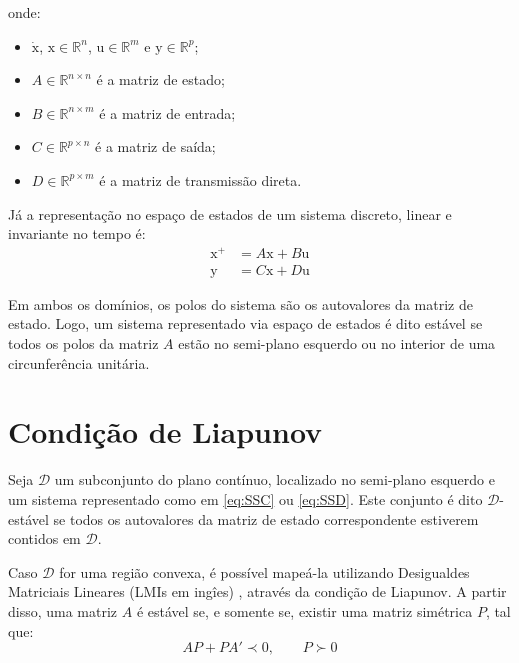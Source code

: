 \noindent onde:

\begin{itemize}
  \item $\dot{\pmb{\mathrm{x}}}$, $\pmb{\mathrm{x}} \in \mathbb{R}^n$, $\pmb{\mathrm{u}} \in \mathbb{R}^m$ e $\pmb{\mathrm{y}} \in \mathbb{R}^p$;
  \item $A \in \mathbb{R}^{n \times n}$ é a matriz de estado;
  \item $B \in \mathbb{R}^{n \times m}$ é a matriz de entrada;
  \item $C \in \mathbb{R}^{p \times n}$ é a matriz de saída;
  \item $D \in \mathbb{R}^{p \times m}$ é a matriz de transmissão direta.
\end{itemize}

Já a representação no espaço de estados de um sistema discreto, linear e invariante no tempo é:
\begin{subequations}
  \label{eq:SSD}
  \begin{align}
    \pmb{\mathrm{x^+}} &= A\pmb{\mathrm{x}} + B\pmb{\mathrm{u}}\label{eq:SSDEntrada}\\
    \pmb{\mathrm{y}} &= C\pmb{\mathrm{x}} + D\pmb{\mathrm{u}}\label{eq:SSDSaida}
  \end{align}
\end{subequations}

Em ambos os domínios, os polos do sistema são os autovalores da matriz de estado. Logo, um sistema representado via espaço de estados é dito estável se todos os polos da matriz $A$ estão no semi-plano esquerdo ou no interior de uma circunferência unitária.

\section{Condição de Liapunov}
Seja $\mathcal{D}$ um subconjunto do plano contínuo, localizado no semi-plano esquerdo e um sistema representado como em \eqref{eq:SSC} ou \eqref{eq:SSD}. Este conjunto é dito $\mathcal{D}$-estável se todos os autovalores da matriz de estado correspondente estiverem contidos em $\mathcal{D}$.

Caso $\mathcal{D}$ for uma região convexa, é possível mapeá-la utilizando Desigualdes Matriciais Lineares (LMIs em ingîes) \cite{CHILALI1996}, através da condição de Liapunov. A partir disso, uma matriz $A$ é estável se, e somente se, existir uma matriz simétrica $P$, tal que:
\begin{equation}
  AP + PA' \prec 0, \qquad P \succ 0\label{eq:LiapunovCondition}
\end{equation}


